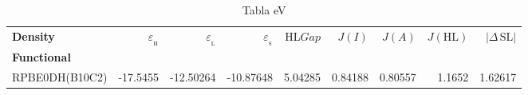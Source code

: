 \documentclass[preprint,landscape,12pt]{elsarticle}
\begin{document}
	\begin{table}
		\caption{ Tabla eV}
		\centering
		\footnotesize
		\begin{tabular}{lrrrrrrrr}
			\hline
			\textbf{Density}    & $\varepsilon_{_{\mathrm{H}}}$	& $\varepsilon_{_{\mathrm{L}}}$  & $\varepsilon_{_{\mathrm{S}}}$& HL$Gap$ & $J(I)$ & $J(A)$ & $J(\mathrm{HL})$  & \textbf{$\left|\Delta\,\mathrm{SL}\right|$}  \\
			\textbf{Functional} &   &  &     &   &  &  &  &  \\
			\hline \hline 

RPBE0DH(B10C2) & -17.5455 & -12.50264 & -10.87648 & 5.04285 & 0.84188 & 0.80557 & 1.1652 & 1.62617\\

	 		\hline
		\end{tabular}
			\label{tab:eV}
	\end{table}
\end{document}
